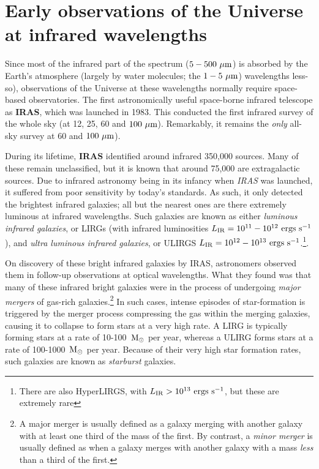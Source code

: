 \documentclass[11pt]{article}
\begin{document}
\section{Early observations of the Universe at infrared wavelengths}
Since most of the infrared part of the spectrum (${\rm 5-500~\mu m}$)
is absorbed by the Earth's atmosphere (largely by water molecules; the
${\rm 1-5~\mu m}$) wavelengths less-so), observations of the Universe
at these wavelengths normally require space-based observatories. The
first astronomically useful space-borne infrared telescope as {\bf
  IRAS}, which was launched in 1983. This conducted the first infrared
survey of the whole sky (at 12, 25, 60 and ${\rm 100~\mu m}$).
Remarkably, it remains the {\it only} all-sky survey at 60 and
${\rm 100~\mu m}$).

During its lifetime, {\bf IRAS} identified around infrared 350,000
sources. Many of these remain unclassified, but it is known that
around 75,000 are extragalactic sources. Due to infrared astronomy
being in its infancy when {\it IRAS} was launched, it suffered from
poor sensitivity by today's standards. As such, it only detected the
brightest infrared galaxies; all but the nearest ones are there
extremely luminous at infrared wavelengths. Such galaxies are known as
either {\it luminous infrared galaxies}, or LIRGs (with infrared
luminosities $L_{\rm IR}=10^{11}-10^{12}~{\rm ergs~s^{-1}}$), and {\it
  ultra luminous infrared galaxies}, or ULIRGS
$L_{\rm IR}=10^{12}-10^{13}~{\rm ergs~s^{-1}}$.\footnote{There are
  also HyperLIRGS, with $L_{\rm IR}>10^{13}~{\rm ergs~s^{-1}}$, but
  these are extremely rare}.

On discovery of these bright infrared galaxies by IRAS, astronomers
observed them in follow-up observations at optical wavelengths. What
they found was that many of these infrared bright galaxies were in the
process of undergoing {\it major mergers} of gas-rich
galaxies.\footnote{ A major merger is usually defined as a galaxy
  merging with another galaxy with at least one third of the mass of
  the first. By contrast, a {\it minor merger} is usually defined as
  when a galaxy merges with another galaxy with a mass {\it less} than
  a third of the first.} In such cases, intense episodes of
star-formation is triggered by the merger process compressing the gas
within the merging galaxies, causing it to collapse to form stars at a
very high rate. A LIRG is typically forming stars at a rate of
10-100~${\rm M_\odot}$ per year, whereas a ULIRG forms stars at a rate
of 100-1000~${\rm M_\odot}$ per year. Because of their very high star
formation rates, such galaxies are known as {\it starburst} galaxies.
\end{document}
